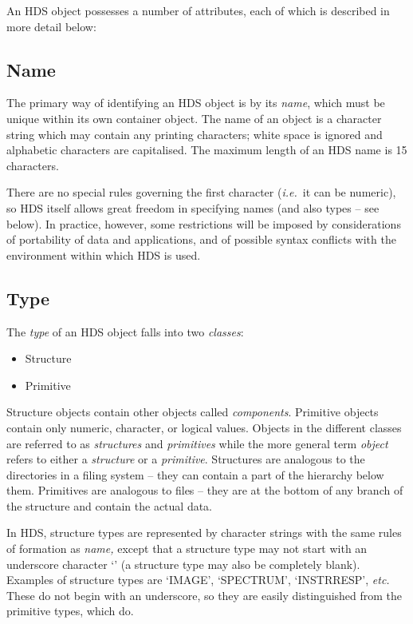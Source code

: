 \documentclass[twoside,11pt]{article}
\newcommand{\htmlref}[2]{#1}
\renewcommand{\_}{\texttt{\symbol{95}}}
\newcommand{\st}[1]{{\em{#1}}}
\begin{document}
An HDS object possesses a number of attributes, each of which is
described in more detail below:

\subsection{\label{sect:name}Name}

The primary way of identifying an HDS object is by its \st{name},
which must be unique within its own container object.  The name of an
object is a character string which may contain any printing
characters; white space is ignored and alphabetic characters are
capitalised. The maximum length of an HDS name is 15 characters.

There are no special rules governing the first character
(\st{i.e.}\ it can be numeric), so HDS itself allows great freedom in specifying
names (and also types -- see \htmlref{below}{sect:type}). In practice,
however, some restrictions will be imposed by considerations of
portability of data and applications, and of possible syntax conflicts
with the environment within which HDS is used.

\subsection{\label{sect:type}Type}

The \st{type} of an HDS object falls into two \st{classes}:

\begin{itemize}
\item Structure
\item Primitive
\end{itemize}

Structure objects contain other objects called
\st{components}. Primitive objects contain only numeric, character, or
logical values. Objects in the different classes are referred to as
\st{structures} and \st{primitives} while the more general term
\st{object} refers to either a \st{structure} or a
\st{primitive}. Structures are analogous to the directories in a
filing system -- they can contain a part of the hierarchy below
them. Primitives are analogous to files -- they are at the bottom of
any branch of the structure and contain the actual data.

In HDS, structure types are represented by character strings with the
same rules of formation as \htmlref{\st{name,}}{sect:name} except that
a structure type may not start with an underscore character `\_' (a
structure type may also be completely blank). Examples of structure
types are `IMAGE', `SPECTRUM', `INSTR\_RESP', \st{etc.} These do not
begin with an underscore, so they are easily distinguished from the
primitive types, which do.
\end{document}

